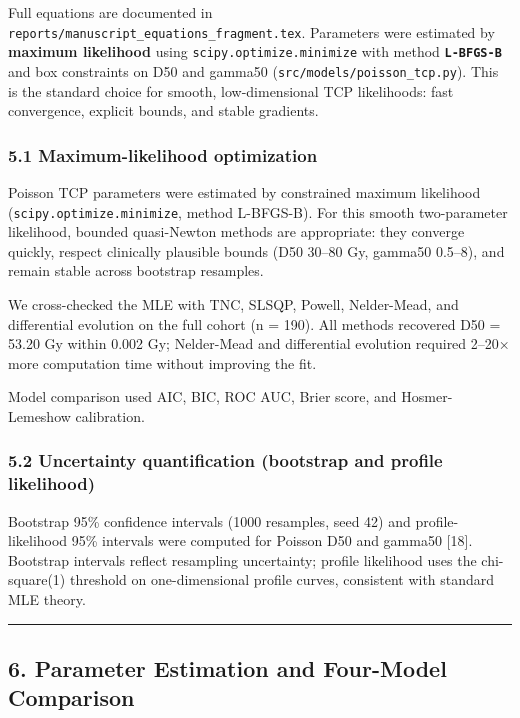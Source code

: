 \documentclass[
  11pt,
]{article}
\begin{document}
Full equations are documented in
\texttt{reports/manuscript\_equations\_fragment.tex}. Parameters were
estimated by \textbf{maximum likelihood} using
\texttt{scipy.optimize.minimize} with method \textbf{\texttt{L-BFGS-B}}
and box constraints on D50 and gamma50
(\texttt{src/models/poisson\_tcp.py}). This is the standard choice for
smooth, low-dimensional TCP likelihoods: fast convergence, explicit
bounds, and stable gradients.

\subsubsection{5.1 Maximum-likelihood
optimization}\label{maximum-likelihood-optimization}

Poisson TCP parameters were estimated by constrained maximum likelihood
(\texttt{scipy.optimize.minimize}, method L-BFGS-B). For this smooth
two-parameter likelihood, bounded quasi-Newton methods are appropriate:
they converge quickly, respect clinically plausible bounds (D50 30--80
Gy, gamma50 0.5--8), and remain stable across bootstrap resamples.

We cross-checked the MLE with TNC, SLSQP, Powell, Nelder-Mead, and
differential evolution on the full cohort (n = 190). All methods
recovered D50 = 53.20 Gy within 0.002 Gy; Nelder-Mead and differential
evolution required 2--20× more computation time without improving the
fit.

Model comparison used AIC, BIC, ROC AUC, Brier score, and
Hosmer-Lemeshow calibration.

\subsubsection{5.2 Uncertainty quantification (bootstrap and profile
likelihood)}\label{uncertainty-quantification-bootstrap-and-profile-likelihood}

Bootstrap 95\% confidence intervals (1000 resamples, seed 42) and
profile-likelihood 95\% intervals were computed for Poisson D50 and
gamma50 {[}18{]}. Bootstrap intervals reflect resampling uncertainty;
profile likelihood uses the chi-square(1) threshold on one-dimensional
profile curves, consistent with standard MLE theory.

\begin{center}\rule{0.5\linewidth}{0.5pt}\end{center}

\subsection{6. Parameter Estimation and Four-Model
Comparison}\label{parameter-estimation-and-four-model-comparison}
\end{document}

